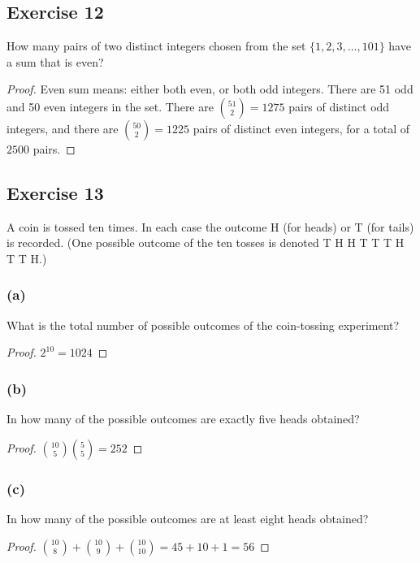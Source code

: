 \documentclass[14pt]{extarticle}
\begin{document}
\subsection{Exercise 12}
How many pairs of two distinct integers chosen from the set \(\{1, 2, 3, \ldots, 101\}\) have a sum that is even?

\begin{proof}
     Even sum means: either both even, or both odd integers. There are 51 odd and 50 even integers in the set. There are
     \(\binom{51}{2} = 1275\) pairs of distinct odd integers, and there are \(\binom{50}{2} = 1225\) pairs of distinct even
     integers, for a total of \(2500\) pairs.
\end{proof}

\subsection{Exercise 13}
A coin is tossed ten times. In each case the outcome H (for heads) or T (for tails) is recorded. (One possible outcome
of the ten tosses is denoted T H H T T T H T T H.)

\subsubsection{(a)}
What is the total number of possible outcomes of the coin-tossing experiment?

\begin{proof}
     \(2^{10} = 1024\)
\end{proof}

\subsubsection{(b)}
In how many of the possible outcomes are exactly five heads obtained?

\begin{proof}
     \(\binom{10}{5}\binom{5}{5} = 252\)
\end{proof}

\subsubsection{(c)}
In how many of the possible outcomes are at least eight heads obtained?

\begin{proof}
     \(\binom{10}{8} + \binom{10}{9} + \binom{10}{10} = 45 + 10 + 1 = 56\)
\end{proof}
\end{document}
